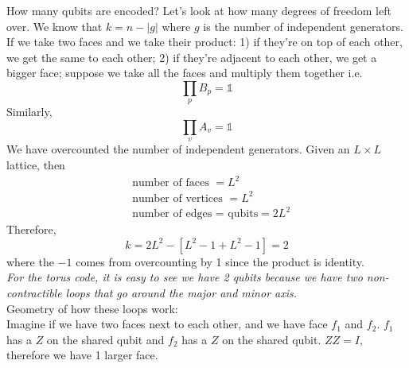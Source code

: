 How many qubits are encoded? Let's look at how many degrees of freedom left over. We know that $k = n - |g|$ where $g$ is the number of independent generators. If we take two faces and we take their product: 1) if they're on top of each other, we get the same to each other; 2) if they're adjacent to each other, we get a bigger face; suppose we take all the faces and multiply them together i.e.
\begin{equation}
    \prod_p B_p = \mathbb{1}
\end{equation}
Similarly,
\begin{equation}
    \prod_v A_v = \mathbb{1}
\end{equation}
We have overcounted the number of independent generators. Given an $L \times L$ lattice, 
then 
\begin{align}
    &\text{number of faces } = L^2 \\
    &\text{number of vertices } = L^2 \\
    &\text{number of edges = qubits} = 2L^2
\end{align}
Therefore, 
\begin{equation}
    k = 2L^2 - [L^2 - 1 + L^2 -1] = 2
\end{equation}
where the $-1$ comes from overcounting by 1 since the product is identity. \\
\textit{For the torus code, it is easy to see we have 2 qubits because we have two non-contractible loops that go around the major and minor axis.} \\

Geometry of how these loops work: \\

Imagine if we have two faces next to each other, and we have face $f_1$ and $f_2$. $f_1$ has a $Z$ on the shared qubit and $f_2$ has a $Z$ on the shared qubit. $ZZ = I$, therefore we have 1 larger face.  \\ 

